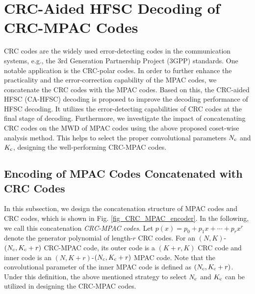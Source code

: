 \documentclass[12pt, draftclsnofoot, peerreview, onecolumn]{IEEEtran}
\theoremstyle{noparent}
\begin{document}
\iffalse
\section{CRC-Aided HFSC Decoding of CRC-MPAC Codes}
\label{sec5}
CRC codes are the widely used error-detecting codes in the communication systems, 
e.g., the 3rd Generation Partnership Project (3GPP) standards. 
One notable application is the CRC-polar codes.
In order to further enhance the practicality and the error-correction capability 
of the MPAC codes, we concatenate the CRC codes with the MPAC codes. 
Based on this, 
the CRC-aided HFSC (CA-HFSC) decoding is proposed to improve the decoding performance of HFSC decoding.
It utilizes the error-detecting capabilities of CRC codes at the final stage of decoding.
Furthermore, 
we investigate the impact of concatenating CRC codes on the MWD of MPAC codes
using the above proposed coset-wise analysis method.
This helps to select the proper convolutional parameters $N_{\rm c}$ and $K_{\rm c}$,
designing the well-performing CRC-MPAC codes.

\subsection{Encoding of MPAC Codes Concatenated with CRC Codes}
In this subsection, we design the concatenation structure of
MPAC codes and CRC codes, which is shown in Fig. \ref{fig_CRC_MPAC_encoder}.
In the following, we call this concatenation {\it CRC-MPAC codes}.
Let $p(x)=p_0 + p_1x + \cdots + p_r x^r$ denote the generator polynomial 
of length-$r$ CRC codes.
For an $(N, K)$-$(N_{\rm c}, K_{\rm c}+r)$ CRC-MPAC code, 
its outer code is a $(K+r, K)$ CRC code and 
inner code is an $(N, K+r)$-$(N_{\rm c}, K_{\rm c}+r)$ MPAC code.
Note that the convolutional parameter of the inner MPAC code is defined as $(N_{\rm c}, K_{\rm c}+r)$.
Under this definition, the above mentioned strategy to select $N_{\rm c}$ and $K_{\rm c}$
can be utilized in designing the CRC-MPAC codes.
\end{document}
